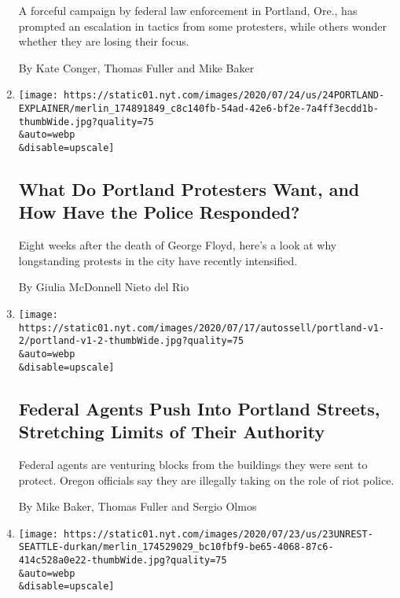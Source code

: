 \begin{enumerate}
  A forceful campaign by federal law enforcement in Portland, Ore., has
  prompted an escalation in tactics from some protesters, while others
  wonder whether they are losing their focus.

  By Kate Conger, Thomas Fuller and Mike Baker
\item
  \href{/article/portland-protests-explained-protesters.html}{}

  \texttt{[image: https://static01.nyt.com/images/2020/07/24/us/24PORTLAND-EXPLAINER/merlin\_174891849\_c8c140fb-54ad-42e6-bf2e-7a4ff3ecdd1b-thumbWide.jpg?quality=75\\\&auto=webp\\\&disable=upscale]}

  \hypertarget{what-do-portland-protesters-want-and-how-have-the-police-responded}{%
  \subsection{What Do Portland Protesters Want, and How Have the Police
  Responded?}\label{what-do-portland-protesters-want-and-how-have-the-police-responded}}

  Eight weeks after the death of George Floyd, here's a look at why
  longstanding protests in the city have recently intensified.

  By Giulia McDonnell Nieto del Rio
\item
  \href{/2020/07/25/us/portland-federal-legal-jurisdiction-courts.html}{}

  \texttt{[image: https://static01.nyt.com/images/2020/07/17/autossell/portland-v1-2/portland-v1-2-thumbWide.jpg?quality=75\\\&auto=webp\\\&disable=upscale]}

  \hypertarget{federal-agents-push-into-portland-streets-stretching-limits-of-their-authority}{%
  \subsection{Federal Agents Push Into Portland Streets, Stretching
  Limits of Their
  Authority}\label{federal-agents-push-into-portland-streets-stretching-limits-of-their-authority}}

  Federal agents are venturing blocks from the buildings they were sent
  to protect. Oregon officials say they are illegally taking on the role
  of riot police.

  By Mike Baker, Thomas Fuller and Sergio Olmos
\item
  \href{/2020/07/23/us/seattle-protests-feds.html}{}

  \texttt{[image: https://static01.nyt.com/images/2020/07/23/us/23UNREST-SEATTLE-durkan/merlin\_174529029\_bc10fbf9-be65-4068-87c6-414c528a0e22-thumbWide.jpg?quality=75\\\&auto=webp\\\&disable=upscale]}


\end{enumerate}

